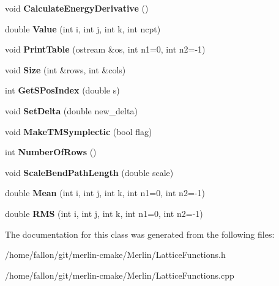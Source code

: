 \begin{DoxyCompactItemize}
void {\bfseries Calculate\+Energy\+Derivative} ()
\item 
\mbox{\label{classLatticeFunctionTable_a8e60c65a50edeb3661a7948264ad33d9}} 
double {\bfseries Value} (int i, int j, int k, int ncpt)
\item 
\mbox{\label{classLatticeFunctionTable_a4adb983bfa720eadce9df6fa98a758c9}} 
void {\bfseries Print\+Table} (ostream \&os, int n1=0, int n2=-\/1)
\item 
\mbox{\label{classLatticeFunctionTable_a79db762960848db5521bfb831aecc76d}} 
void {\bfseries Size} (int \&rows, int \&cols)
\item 
\mbox{\label{classLatticeFunctionTable_a7b5bb004a331cc07d0bbd45abcae0b50}} 
int {\bfseries Get\+S\+Pos\+Index} (double s)
\item 
\mbox{\label{classLatticeFunctionTable_a6343f0db5047789aaf2c7356dcbceace}} 
void {\bfseries Set\+Delta} (double new\+\_\+delta)
\item 
\mbox{\label{classLatticeFunctionTable_a90371231e8ae46af4259b8c17c2be70d}} 
void {\bfseries Make\+T\+M\+Symplectic} (bool flag)
\item 
\mbox{\label{classLatticeFunctionTable_a573d27f32ebae61d8e283c7703d52f11}} 
int {\bfseries Number\+Of\+Rows} ()
\item 
\mbox{\label{classLatticeFunctionTable_a7800b666c3b881a0b52df70caa0a1ae6}} 
void {\bfseries Scale\+Bend\+Path\+Length} (double scale)
\item 
\mbox{\label{classLatticeFunctionTable_a05ab7fc7c5ff546f4589cf2e43ff41fb}} 
double {\bfseries Mean} (int i, int j, int k, int n1=0, int n2=-\/1)
\item 
\mbox{\label{classLatticeFunctionTable_a209a618b236781d931666a51b34412e6}} 
double {\bfseries R\+MS} (int i, int j, int k, int n1=0, int n2=-\/1)
\end{DoxyCompactItemize}


The documentation for this class was generated from the following files\+:\begin{DoxyCompactItemize}
\item 
/home/fallon/git/merlin-\/cmake/\+Merlin/Lattice\+Functions.\+h\item 
/home/fallon/git/merlin-\/cmake/\+Merlin/Lattice\+Functions.\+cpp\end{DoxyCompactItemize}
